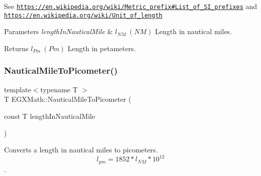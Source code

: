 See \href{https://en.wikipedia.org/wiki/Metric_prefix#List_of_SI_prefixes}{\tt https\+://en.\+wikipedia.\+org/wiki/\+Metric\+\_\+prefix\#\+List\+\_\+of\+\_\+\+S\+I\+\_\+prefixes} and \href{https://en.wikipedia.org/wiki/Unit_of_length}{\tt https\+://en.\+wikipedia.\+org/wiki/\+Unit\+\_\+of\+\_\+length} 
\begin{DoxyParams}{Parameters}
{\em length\+In\+Nautical\+Mile} & $ l_{NM}\ (NM)$ Length in nautical miles. \\
\hline
\end{DoxyParams}
\begin{DoxyReturn}{Returns}
$ l_{Pm}\ (Pm)$ Length in petameters. 
\end{DoxyReturn}
\mbox{\label{group___e_g_x_math-_conversions-_length_conversions-_non-_s_i-_nautical_mile-_s_i_ga5ab6a92054685d45fb032111bcde94e0}} 
\subsubsection{\texorpdfstring{Nautical\+Mile\+To\+Picometer()}{NauticalMileToPicometer()}}
{\footnotesize\ttfamily template$<$typename T $>$ \\
T E\+G\+X\+Math\+::\+Nautical\+Mile\+To\+Picometer (\begin{DoxyParamCaption}\item[{const T}]{length\+In\+Nautical\+Mile }\end{DoxyParamCaption})}



Converts a length in nautical miles to picometers. \[ l_{pm}=1852 * l_{NM} * 10^{12} \]. 


